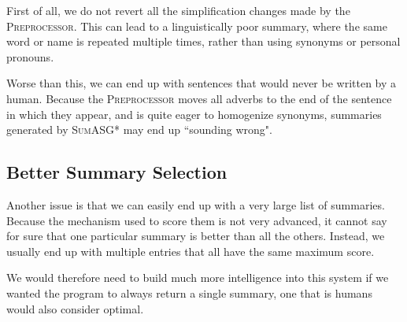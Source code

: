 First of all, we do not revert all the simplification changes made by the \textsc{Preprocessor}. This can lead to a linguistically poor summary, where the same word or name is repeated multiple times, rather than using synonyms or personal pronouns.

Worse than this, we can end up with sentences that would never be written by a human. Because the \textsc{Preprocessor} moves all adverbs to the end of the sentence in which they appear, and is quite eager to homogenize synonyms, summaries generated by \textsc{SumASG*} may end up ``sounding wrong".

\subsection{Better Summary Selection}

Another issue is that we can easily end up with a very large list of summaries. Because the mechanism used to score them is not very advanced, it cannot say for sure that one particular summary is better than all the others. Instead, we usually end up with multiple entries that all have the same maximum score.

We would therefore need to build much more intelligence into this system if we wanted the program to always return a single summary, one that is humans would also consider optimal.